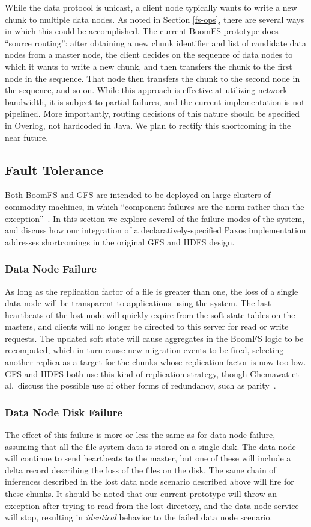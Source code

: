 \documentclass[twocolumn]{article}
\begin{document}
While the data protocol is unicast, a client node typically wants to
write a new chunk to multiple data nodes. As noted in Section
\ref{fs-ops}, there are several ways in which this could be
accomplished. The current BoomFS prototype does ``source routing'':
after obtaining a new chunk identifier and list of candidate data
nodes from a master node, the client decides on the sequence of data
nodes to which it wants to write a new chunk, and then transfers the
chunk to the first node in the sequence. That node then transfers the
chunk to the second node in the sequence, and so on. While this
approach is effective at utilizing network bandwidth, it is subject to
partial failures, and the current implementation is not
pipelined. More importantly, routing decisions of this nature should
be specified in Overlog, not hardcoded in Java. We plan to rectify
this shortcoming in the near future.

\subsection{Fault Tolerance}
Both BoomFS and GFS are intended to be deployed on large clusters of
commodity machines, in which ``component failures are the norm rather
than the exception''~\cite{gfs}.  In this section we explore several
of the failure modes of the system, and discuss how our integration of
a declaratively-specified Paxos implementation addresses shortcomings
in the original GFS and HDFS design.

\subsubsection{Data Node Failure}
As long as the replication factor of a file is greater than one, the
loss of a single data node will be transparent to applications using
the system.  The last heartbeats of the lost node will quickly expire
from the soft-state tables on the masters, and clients will no longer
be directed to this server for read or write requests.  The updated
soft state will cause aggregates in the BoomFS logic to be recomputed,
which in turn cause new migration events to be fired, selecting
another replica as a target for the chunks whose replication factor is
now too low.  GFS and HDFS both use this kind of replication strategy,
though Ghemawat et al.\ discuss the possible use of other forms of
redundancy, such as parity~\cite{gfs}.

\subsubsection{Data Node Disk Failure}
The effect of this failure is more or less the same as for data node
failure, assuming that all the file system data is stored on a single
disk.  The data node will continue to send heartbeats to the master,
but one of these will include a delta record describing the loss of
the files on the disk.  The same chain of inferences described in the
lost data node scenario described above will fire for these chunks.
It should be noted that our current prototype will throw an exception
after trying to read from the lost directory, and the data node
service will stop, resulting in \emph{identical} behavior to the
failed data node scenario.
\end{document}
